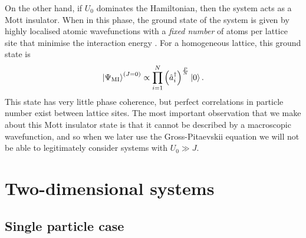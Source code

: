 \documentclass[a4paper, 10pt]{article}
\theoremstyle{plain}
\begin{document}
On the other hand, if $U_{0}$ dominates the Hamiltonian, then the
system acts as a Mott insulator. When in this phase, the
ground state of the system is given by highly localised atomic wavefunctions
with a \emph{fixed number} of atoms per lattice site that minimise the
interaction energy \cite{Bloch2005}. For a homogeneous lattice, this ground
state is
\begin{equation}
    \ket{\Psi_{\text{MI}}}^{\left(J=0\right)}
    \propto
    \prod_{i=1}^N \left( \hat{a}_i^\dagger \right)^\frac{P}{N}
    \ket{0}.
\end{equation}
This state has very little phase coherence, but perfect correlations in particle
number exist between lattice sites. The most important observation that we make about this
Mott insulator state is that it cannot be described by a macroscopic
wavefunction, and so when we later use the Gross-Pitaevskii equation we will
not be able to legitimately consider systems with $U_{0} \gg J$.


\section{Two-dimensional systems\label{2Dsystems}}

\subsection{Single particle case\label{2DNoninteractingsection}}
\end{document}
